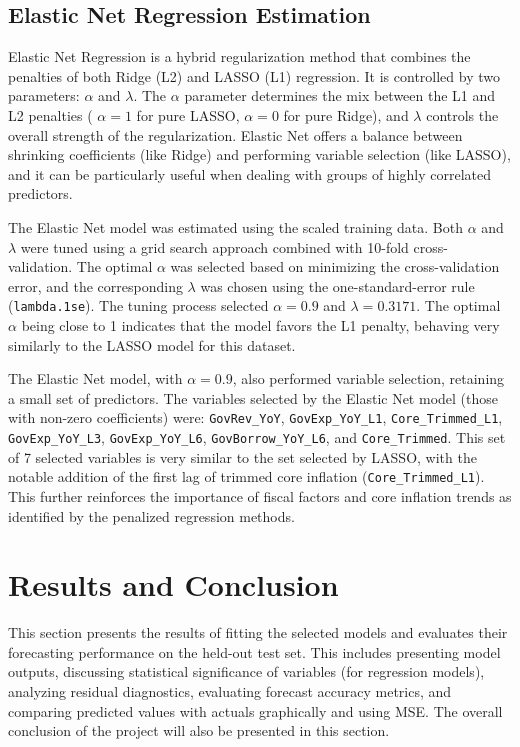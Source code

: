 \documentclass[12pt,a4paper]{article}
\begin{document}
\subsection{Elastic Net Regression Estimation}
Elastic Net Regression is a hybrid regularization method that combines the penalties of both Ridge (L2) and LASSO (L1) regression. It is controlled by two parameters: $\alpha$ and $\lambda$. The $\alpha$ parameter determines the mix between the L1 and L2 penalties ( $\alpha=1$ for pure LASSO, $\alpha=0$ for pure Ridge), and $\lambda$ controls the overall strength of the regularization. Elastic Net offers a balance between shrinking coefficients (like Ridge) and performing variable selection (like LASSO), and it can be particularly useful when dealing with groups of highly correlated predictors.

The Elastic Net model was estimated using the scaled training data. Both $\alpha$ and $\lambda$ were tuned using a grid search approach combined with 10-fold cross-validation. The optimal $\alpha$ was selected based on minimizing the cross-validation error, and the corresponding $\lambda$ was chosen using the one-standard-error rule (\texttt{lambda.1se}). The tuning process selected $\alpha = 0.9$ and $\lambda = 0.3171$. The optimal $\alpha$ being close to 1 indicates that the model favors the L1 penalty, behaving very similarly to the LASSO model for this dataset.

The Elastic Net model, with $\alpha=0.9$, also performed variable selection, retaining a small set of predictors. The variables selected by the Elastic Net model (those with non-zero coefficients) were: \texttt{GovRev\_YoY}, \texttt{GovExp\_YoY\_L1}, \texttt{Core\_Trimmed\_L1}, \texttt{GovExp\_YoY\_L3}, \texttt{GovExp\_YoY\_L6}, \texttt{GovBorrow\_YoY\_L6}, and \texttt{Core\_Trimmed}. This set of 7 selected variables is very similar to the set selected by LASSO, with the notable addition of the first lag of trimmed core inflation (\texttt{Core\_Trimmed\_L1}). This further reinforces the importance of fiscal factors and core inflation trends as identified by the penalized regression methods.

\section{Results and Conclusion}

This section presents the results of fitting the selected models and evaluates their forecasting performance on the held-out test set. This includes presenting model outputs, discussing statistical significance of variables (for regression models), analyzing residual diagnostics, evaluating forecast accuracy metrics, and comparing predicted values with actuals graphically and using MSE. The overall conclusion of the project will also be presented in this section.
\end{document}
